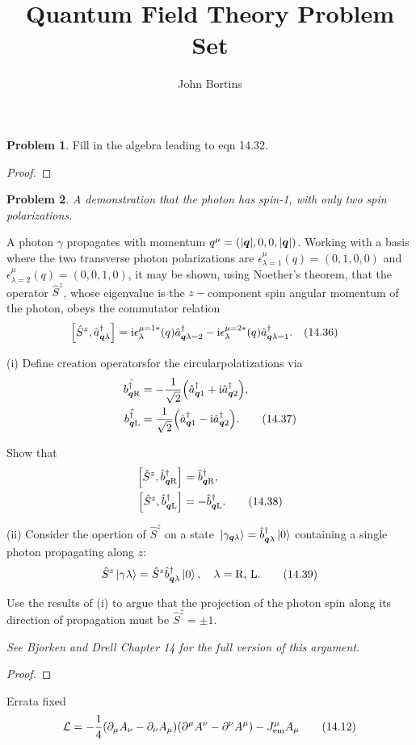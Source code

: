\documentclass[letterpaper]{article}
\title{Quantum Field Theory Problem Set}
\author{John Bortins}
\theoremstyle{definition}
\newtheorem{prob}{Problem}[section]
\begin{document}
\maketitle{}


\begin{prob}
  Fill in the algebra leading to eqn 14.32.
\end{prob}

\begin{proof}
\end{proof}



\begin{prob}
  \emph{A demonstration that the photon has spin-1, with only two spin polarizations.}

  A photon \(\gamma\) propagates with momentum \(q^\mu=(|\vb*{q}|,0,0,|\vb*{q}|)\). Working with a basis where the two transverse photon polarizations are \(\epsilon^\mu_{\lambda=1}(q)=(0,1,0,0)\) and \(\epsilon^\mu_{\lambda=2}(q)=(0,0,1,0)\), it may be shown, using Noether's theorem, that the operator \(\hat{S}^z\), whose eigenvalue is the \(z-\)component spin angular momentum of the photon, obeys the commutator relation \[\bqty{\hat{S}^z,\hat{a}^\dagger_{\vb*{q}\lambda}}=\text{i}\epsilon^{\mu=1*}_\lambda(q)\hat{a}^\dagger_{\vb*{q}\lambda=2}-\text{i}\epsilon^{\mu=2*}_\lambda(q)\hat{a}^\dagger_{\vb*{q}\lambda=1}.\qq{(14.36)}\]

  (i) Define creation operatorsfor the circularpolatizations via
  \begin{align*}\hat{b^\dagger_{\vb*{q}\text{R}}}&=-\frac{1}{\sqrt{2}}\pqty{\hat{a}^\dagger_{\vb*{q}1}+\text{i}\hat{a}^\dagger_{\vb*{q}2}},\\\hat{b^\dagger_{\vb*{q}\text{L}}}&=\frac{1}{\sqrt{2}}\pqty{\hat{a}^\dagger_{\vb*{q}1}-\text{i}\hat{a}^\dagger_{\vb*{q}2}}.\qquad(14.37) \end{align*}


  Show that\begin{align*}\bqty{\hat{S}^z,\hat{b}^\dagger_{\vb*{q}\text{R}}}&=\hat{b}^\dagger_{\vb*{q}\text{R}},\\\bqty{\hat{S}^z,\hat{b}^\dagger_{\vb*{q}\text{L}}}&=-\hat{b}^\dagger_{\vb*{q}\text{L}}.\qquad(14.38)\end{align*}

  (ii) Consider the opertion of \(\hat{S}^z\) on a state \(\ket*{\gamma_{\vb*{q}\lambda}}=\hat{b}^\dagger_{\vb*{q}\lambda}\ket*{0}\) containing a single photon propagating along \(z\):\[\hat{S}^z\ket*{\gamma\lambda}=\hat{S}^z\hat{b}^\dagger_{\vb*{q}\lambda}\ket*{0}\qcomma\lambda=\text{R, L.}\qquad(14.39)\]

  Use the results of (i) to argue that the projection of the photon spin along its direction of propagation must be \(\hat{S}^z=\pm 1.\)

  \emph{See Bjorken and Drell Chapter 14 for the full version of this argument.}
\end{prob}

\begin{proof}
\end{proof}

Errata fixed
\[\mathcal{L}=-\frac{1}{4}\pqty{\partial_\mu A_\nu-\partial_\nu A_\mu}\pqty{\partial^\mu A^\nu-\partial^\nu A^\mu}-J^\mu_{\text{em}}A_\mu \qquad(14.12)\]
\end{document}
